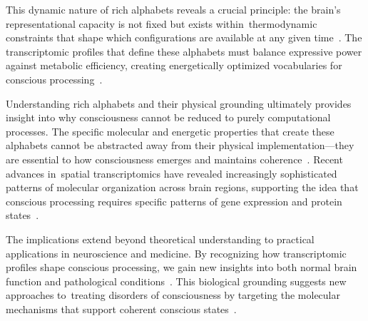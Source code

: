 This dynamic nature of rich alphabets reveals a crucial principle: the brain's representational capacity is not fixed but exists within~thermodynamic constraints that shape which configurations are available at any given time~\cite{faisal2008}. The transcriptomic profiles that define these alphabets must balance expressive power against metabolic efficiency, creating energetically optimized vocabularies for conscious processing~\cite{mcdonnell2011}.

Understanding rich alphabets and their physical grounding ultimately provides insight into why consciousness cannot be reduced to purely computational processes. The specific molecular and energetic properties that create these alphabets cannot be abstracted away from their physical implementation—they are essential to how consciousness emerges and maintains coherence~\cite{siletti2023transcriptomic}. Recent advances in~spatial transcriptomics have revealed increasingly sophisticated patterns of molecular organization across brain regions, supporting the idea that conscious processing requires specific patterns of gene expression and protein states~\cite{bakken2021comparative}.

The implications extend beyond theoretical understanding to practical applications in neuroscience and medicine. By recognizing how transcriptomic profiles shape conscious processing, we gain new insights into both normal brain function and pathological conditions~\cite{zhang2023adaptive}. This biological grounding suggests new approaches to~treating disorders of consciousness by targeting the molecular mechanisms that support coherent conscious states~\cite{pinotsis2023cytoelectric}.

